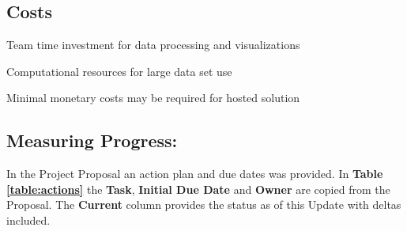 \documentclass[sigconf,nonacm=true]{acmart}
\newenvironment{my_itemize}{
	\begin{itemize}
		\setlength{\itemsep}{1pt}
		\setlength{\parskip}{0pt}
		\setlength{\parsep}{0pt}}
	{\end{itemize}
}
\begin{document}
\subsection{Costs}
\begin{my_itemize}
	\item Team time investment for data processing and visualizations
	\item Computational resources for large data set use
	\item Minimal monetary costs may be required for hosted solution
\end{my_itemize}

\newpage
\subsection{Measuring Progress:}
In the Project Proposal an action plan and due dates was provided.  In \textbf{Table \ref{table:actions}} the \textbf{Task},  \textbf{Initial Due Date} and \textbf{Owner} are copied from the Proposal.  The \textbf{Current} column provides the status as of this Update with deltas included.
\end{document}
